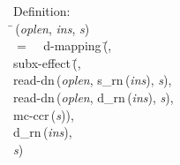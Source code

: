 \begin{tabbing}{\sc Definition}: \\  
\=\,({\it{oplen\/}}, {\it{ins\/}}, {\it{s\/}}) \\ 
$=$$\;\;\;\;${\rm{d-mapping}}\,(\=, \\ 
{\rm{subx-effect}}\,(\=, \\ 
{\rm{read-dn}}\,({\it{oplen\/}}, {\rm{s\_rn}}\,({\it{ins\/}}), {\it{s\/}}), \\ 
{\rm{read-dn}}\,({\it{oplen\/}}, {\rm{d\_rn}}\,({\it{ins\/}}), {\it{s\/}}), \\ 
{\rm{mc-ccr}}\,({\it{s\/}}))\-, \\ 
{\rm{d\_rn}}\,({\it{ins\/}}), \\ 
{\it{s\/}})\-\-
\end{tabbing}

